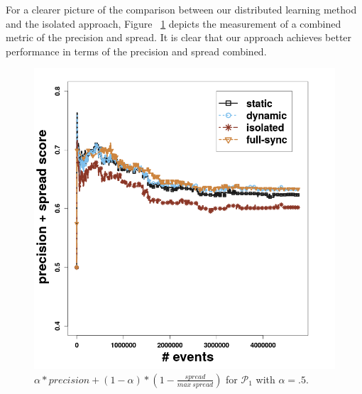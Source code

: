 \par For a clearer picture of the comparison between our distributed learning method and the isolated approach, Figure ~\ref{fig:spread_prec} depicts the measurement of a combined metric of the precision and spread. It is clear that our approach achieves better performance in terms of the precision and spread combined.  

\begin{center}
	\centering
	\begin{figure}[H]
		
		\includegraphics[width=\textwidth]{chapters/figures/synopses/p1_new_score_100_2_08.png}
		
		\caption{$ \alpha * precision + (1 - \alpha ) * ( 1- \frac{spread}{max\  spread})$ for $\mathcal{P}_1$ with $\alpha = .5$.}
		\label{fig:spread_prec}
	\end{figure}
\end{center}


